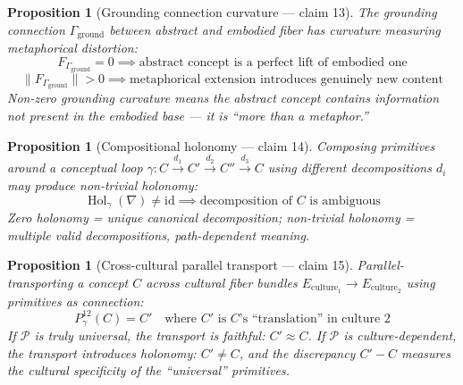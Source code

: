 \documentclass[11pt,a4paper]{article}
\newtheorem{proposition}[definition]{Proposition}
\begin{document}
\begin{proposition}[Grounding connection curvature --- claim 13]
\label{prop:grounding}
The grounding connection $\Gamma_{\text{ground}}$ between abstract and
embodied fiber has curvature measuring metaphorical distortion:
\[
  F_{\Gamma_{\text{ground}}} = 0 \implies \text{abstract concept is a
    perfect lift of embodied one}
\]
\[
  \|F_{\Gamma_{\text{ground}}}\| > 0 \implies \text{metaphorical extension
    introduces genuinely new content}
\]
Non-zero grounding curvature means the abstract concept contains
information not present in the embodied base --- it is ``more than a
metaphor.''
\end{proposition}

\begin{proposition}[Compositional holonomy --- claim 14]
\label{prop:holonomy}
Composing primitives around a conceptual loop
$\gamma: C \xrightarrow{d_1} C' \xrightarrow{d_2} C'' \xrightarrow{d_3} C$
using different decompositions $d_i$ may produce non-trivial holonomy:
\[
  \operatorname{Hol}_\gamma(\nabla) \neq \mathrm{id}
  \implies \text{decomposition of } C \text{ is ambiguous}
\]
Zero holonomy = unique canonical decomposition; non-trivial holonomy =
multiple valid decompositions, path-dependent meaning.
\end{proposition}

\begin{proposition}[Cross-cultural parallel transport --- claim 15]
\label{prop:transport}
Parallel-transporting a concept $C$ across cultural fiber bundles
$E_{\text{culture}_1} \to E_{\text{culture}_2}$ using primitives as
connection:
\[
  P_\gamma^{12}(C) = C' \quad \text{where } C' \text{ is } C \text{'s
    ``translation'' in culture 2}
\]
If $\mathcal{P}$ is truly universal, the transport is faithful:
$C' \approx C$. If $\mathcal{P}$ is culture-dependent, the transport
introduces holonomy: $C' \neq C$, and the discrepancy $C' - C$ measures
the cultural specificity of the ``universal'' primitives.
\end{proposition}
\end{document}
